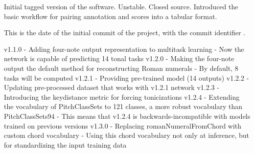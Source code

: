Initial tagged version of the software. Unstable. Closed
source. Introduced the basic workflow for pairing annotation
and scores into a tabular format.


This is the date of the initial commit of the project, with
the commit identifier .

v1.1.0
    - Adding four-note output representation to multitask learning
    - Now the network is capable of predicting 14 tonal tasks
v1.2.0
    - Making the four-note output the default method for reconstructing Roman numerals
    - By default, 8 tasks will be computed
v1.2.1
    - Providing pre-trained model (14 outputs)
v1.2.2
    - Updating pre-processed dataset that works with v1.2.1 network
v1.2.3
    - Introducing the keydistance metric for forcing tonicizations
v1.2.4
    - Extending the vocabulary of PitchClassSets to 121 classes, a more robust vocabulary than PitchClassSets94
    - This means that v1.2.4 is backwards-incompatible with models trained on previous versions
v1.3.0
    - Replacing romanNumeralFromChord with custom chord vocabulary
    - Using this chord vocabulary not only at inference, but for standardizing the input training data

